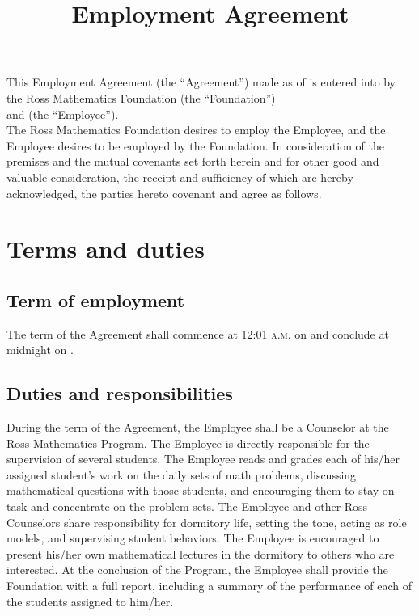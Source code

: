 \documentclass{ross}
\title{Employment Agreement}
\begin{document}
\maketitle

This Employment Agreement (the ``Agreement'') made as of  is
entered into by the Ross Mathematics Foundation (the ``Foundation'') \\
and  (the ``Employee'').\\

The Ross Mathematics Foundation desires to employ the Employee, and
the Employee desires to be employed by the Foundation.  
In consideration of the premises and the mutual covenants
set forth herein and for other good and valuable consideration, the
receipt and sufficiency of which are hereby acknowledged, the parties
hereto covenant and agree as follows.

\section{Terms and duties}

\subsection{Term of employment}

The term of the Agreement shall commence at 12:01 \textsc{a.m.} on 
 and conclude at midnight on
.

\subsection{Duties and responsibilities}

During the term of the Agreement, the Employee shall be a Counselor at
the Ross Mathematics Program.  The Employee is directly responsible
for the supervision of several students.  The Employee reads and
grades each of his/her assigned student's work on the daily sets of
math problems, discussing mathematical questions with those students,
and encouraging them to stay on task and concentrate on the problem
sets.  The Employee and other Ross Counselors share responsibility for
dormitory life, setting the tone, acting as role models, and
supervising student behaviors.  The Employee is encouraged to present
his/her own mathematical lectures in the dormitory to others who are
interested.  At the conclusion of the Program, the Employee shall
provide the Foundation with a full report, including a summary of the
performance of each of the students assigned to him/her.
\end{document}
